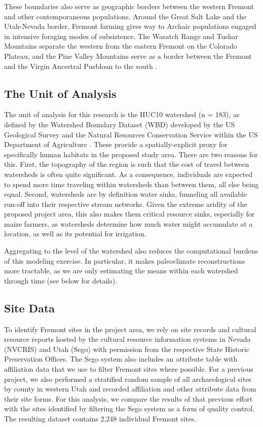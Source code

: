 \documentclass[
  number,
  preprint,
  3p]{elsarticle}
\begin{document}
These boundaries also serve as geographic borders between the western
Fremont and other contemporaneous populations. Around the Great Salt
Lake and the Utah-Nevada border, Fremont farming gives way to Archaic
populations engaged in intensive foraging modes of subsistence. The
Wasatch Range and Tushar Mountains separate the western from the eastern
Fremont on the Colorado Plateau, and the Pine Valley Mountains serve as
a border between the Fremont and the Virgin Ancestral Puebloan to the
south \citep{simms2008}.

\hypertarget{the-unit-of-analysis}{%
\subsection{The Unit of Analysis}\label{the-unit-of-analysis}}

The unit of analysis for this research is the HUC10 watershed (n = 183),
as defined by the Watershed Boundary Dataset (WBD) developed by the US
Geological Survey and the Natural Resources Conservation Service within
the US Department of Agriculture \citep{usgs2013}. These provide a
spatially-explicit proxy for specifically human habitats in the proposed
study area. There are two reasons for this. First, the topography of the
region is such that the cost of travel between watersheds is often quite
significant. As a consequence, individuals are expected to spend more
time traveling within watersheds than between them, all else being
equal. Second, watersheds are by definition water sinks, funneling all
available run-off into their respective stream networks. Given the
extreme aridity of the proposed project area, this also makes them
critical resource sinks, especially for maize farmers, as watersheds
determine how much water might accumulate at a location, as well as its
potential for irrigation.

Aggregating to the level of the watershed also reduces the computational
burdens of this modeling exercise. In particular, it makes paleoclimate
reconstructions more tractable, as we are only estimating the means
within each watershed through time (see below for details).

\hypertarget{site-data}{%
\subsection{Site Data}\label{site-data}}

To identify Fremont sites in the project area, we rely on site records
and cultural resource reports hosted by the cultural resource
information systems in Nevada (NVCRIS) and Utah (Sego) with permission
from the respective State Historic Preservation Offices. The Sego system
also includes an attribute table with affiliation data that we use to
filter Fremont sites where possible. For a previous project, we also
performed a stratified random sample of all archaeological sites by
county in western Utah and recorded affiliation and other attribute data
from their site forms. For this analysis, we compare the results of that
previous effort with the sites identified by filtering the Sego system
as a form of quality control. The resulting dataset contains 2,248
individual Fremont sites.
\end{document}
